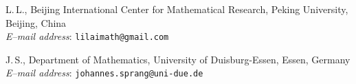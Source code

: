 \documentclass[12pt]{article}
\numberwithin{equation}{section}
\begin{document}
\vspace*{3mm}
\begin{flushright}
\begin{minipage}{148mm}\sc\footnotesize
L.\,L., Beijing International Center for Mathematical Research, Peking University, Beijing, China\\
{\it E--mail address}: {\tt lilaimath@gmail.com} \vspace*{3mm}
\end{minipage}
\end{flushright}

\begin{flushright}
\begin{minipage}{148mm}\sc\footnotesize
J.\,S., Department of Mathematics, University of Duisburg-Essen, Essen, Germany \\
{\it E--mail address}: {\tt johannes.sprang@uni-due.de } \vspace*{3mm}
\end{minipage}
\end{flushright}
\end{document}
